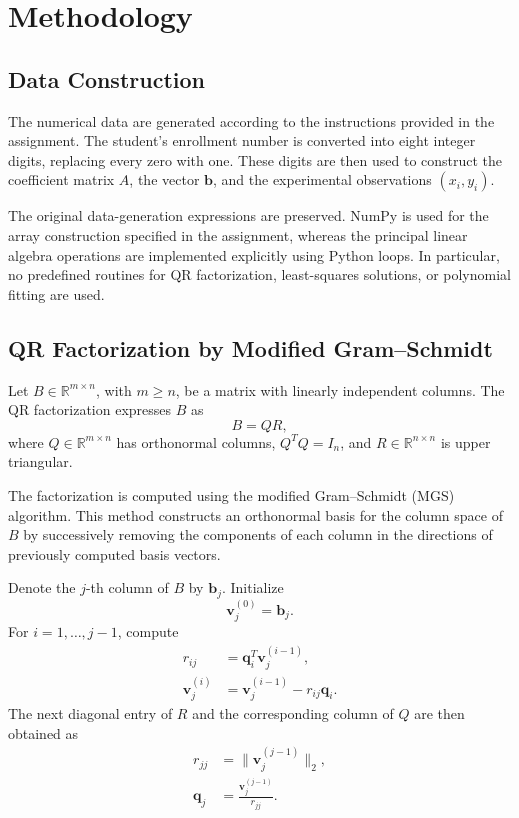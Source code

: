 \section{Methodology}
\label{sec:methodology}

\subsection{Data Construction}

The numerical data are generated according to the instructions provided
in the assignment. The student's enrollment number is converted into
eight integer digits, replacing every zero with one. These digits are
then used to construct the coefficient matrix $A$, the vector
$\mathbf{b}$, and the experimental observations $(x_i,y_i)$.

The original data-generation expressions are preserved. NumPy is used
for the array construction specified in the assignment, whereas the
principal linear algebra operations are implemented explicitly using
Python loops. In particular, no predefined routines for QR
factorization, least-squares solutions, or polynomial fitting are used.

\subsection{QR Factorization by Modified Gram--Schmidt}

Let $B\in\mathbb{R}^{m\times n}$, with $m\geq n$, be a matrix with
linearly independent columns. The QR factorization expresses $B$ as
\begin{equation}
    B=QR,
    \label{eq:qr-factorization}
\end{equation}
where $Q\in\mathbb{R}^{m\times n}$ has orthonormal columns,
$Q^TQ=I_n$, and $R\in\mathbb{R}^{n\times n}$ is upper triangular.

The factorization is computed using the modified Gram--Schmidt
(MGS) algorithm. This method constructs an orthonormal basis for the
column space of $B$ by successively removing the components of each
column in the directions of previously computed basis vectors.

Denote the $j$-th column of $B$ by $\mathbf{b}_j$. Initialize
\begin{equation}
    \mathbf{v}_j^{(0)}=\mathbf{b}_j.
\end{equation}
For $i=1,\ldots,j-1$, compute
\begin{align}
    r_{ij}
     & =\mathbf{q}_i^T\mathbf{v}_j^{(i-1)},      \\
    \mathbf{v}_j^{(i)}
     & =\mathbf{v}_j^{(i-1)}-r_{ij}\mathbf{q}_i.
\end{align}
The next diagonal entry of $R$ and the corresponding column of $Q$
are then obtained as
\begin{align}
    r_{jj} & =\|\mathbf{v}_j^{(j-1)}\|_2,          \\
    \mathbf{q}_j
           & =\frac{\mathbf{v}_j^{(j-1)}}{r_{jj}}.
\end{align}

